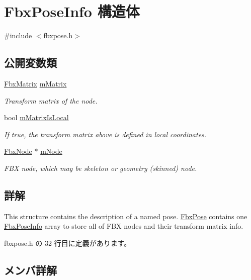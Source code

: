\hypertarget{struct_fbx_pose_info}{}\section{Fbx\+Pose\+Info 構造体}
\label{struct_fbx_pose_info}


{\ttfamily \#include $<$fbxpose.\+h$>$}

\subsection*{公開変数類}
\begin{DoxyCompactItemize}
\item 
\hyperlink{class_fbx_matrix}{Fbx\+Matrix} \hyperlink{struct_fbx_pose_info_aca02d941e426a2f6abbce9902ae92d73}{m\+Matrix}
\begin{DoxyCompactList}\small\item\em Transform matrix of the node. \end{DoxyCompactList}\item 
bool \hyperlink{struct_fbx_pose_info_a8da52035b7e08cafc70aa419111c7142}{m\+Matrix\+Is\+Local}
\begin{DoxyCompactList}\small\item\em If true, the transform matrix above is defined in local coordinates. \end{DoxyCompactList}\item 
\hyperlink{class_fbx_node}{Fbx\+Node} $\ast$ \hyperlink{struct_fbx_pose_info_a06e5aa4a4b65795d0a0bd87e4c79c74c}{m\+Node}
\begin{DoxyCompactList}\small\item\em F\+BX node, which may be skeleton or geometry (skinned) node. \end{DoxyCompactList}\end{DoxyCompactItemize}


\subsection{詳解}
This structure contains the description of a named pose. \hyperlink{class_fbx_pose}{Fbx\+Pose} contains one \hyperlink{struct_fbx_pose_info}{Fbx\+Pose\+Info} array to store all of F\+BX nodes and their transform matrix info. 

 fbxpose.\+h の 32 行目に定義があります。



\subsection{メンバ詳解}
\mbox{\label{struct_fbx_pose_info_aca02d941e426a2f6abbce9902ae92d73}} 
